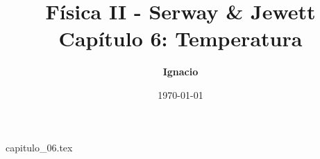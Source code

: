 \documentclass[11pt,spanish,oneside]{report}
\title{\textbf{Física II - Serway \& Jewett} \\ \Large Capítulo 6: Temperatura}
\author{\textbf{Ignacio}}
\date{\today}
\begin{document}
\maketitle

{capitulo_06.tex}
\end{document}
